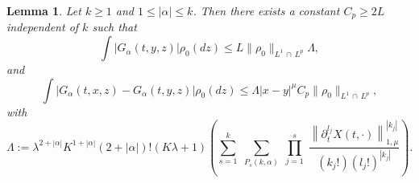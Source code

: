 \documentclass[10pt]{amsart}
\newtheorem{lemm}[theo]{Lemma}\newtheorem{prop}[theo]{Proposition}\newtheorem{coro}[theo]{Corollary}\newtheorem{conj}[theo]{Conjecture}
\theoremstyle{definition}\newtheorem{defi}[theo]{Definition}\newtheorem{rema}[theo]{Remark}\newtheorem{exam}[theo]{Example}\newtheorem{exem}[theo]{Example}\newtheorem{nota}[theo]{Notation}
\renewcommand{\leq}{\leqslant}
\renewcommand{\geq}{\geqslant}
\begin{document}
\begin{lemm}\label{lemme_Miot_general}
Let $k\geq 1$ and $1\leq |\alpha|\leq k$. Then there exists a constant $C_p\geq 2L$ independent of $k$ such that
\begin{equation}\label{Rapp}
\int \left|G_\alpha(t,y,z) \right|\rho_0(dz) \leq L \|\rho_0\|_{L^1\,\cap\,L^p} \Lambda,
\end{equation}
and
\begin{equation}\label{Rapp-diff}
\int \left|G_\alpha(t,x,z)-G_\alpha(t,y,z)\right| \rho_0(dz) \leq \Lambda |x-y|^\mu C_p\|\rho_0\|_{L^1\,\cap\,L^p},
\end{equation}
with
\begin{equation}\label{def-Lamb}
\Lambda:= \lambda^{2+|\alpha|} K^{1+|\alpha|}(2+|\alpha|)! \left(K\lambda+1 \right)\left(\underset{s=1}{\overset{k}{\sum}}\;\underset{P_s(k,\alpha)}{\sum}\;\underset{j=1}{\overset{s}{\prod}}\;\frac{\left\|\partial_t^{l_j}X(t,\cdot) \right\|_{1,\mu}^{\left|k_j\right|}}{\left(k_j!\right) \left(l_j!\right)^{\left|k_j\right|}}\right).
\end{equation}
\end{lemm}
\end{document}
